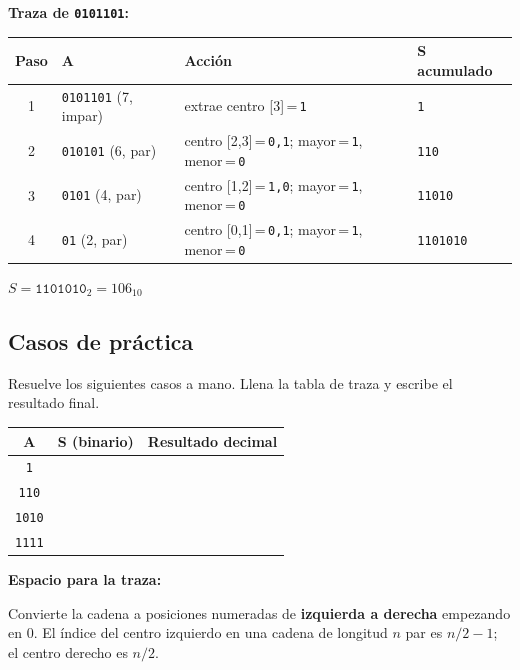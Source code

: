 \documentclass[12pt, oneside]{article}
\begin{document}
\textbf{Traza de \texttt{0101101}:}

\begin{center}
\begin{tabular}{clp{4cm}l}
  \toprule
  \textbf{Paso} & \textbf{A} & \textbf{Acción} & \textbf{S acumulado} \\
  \midrule
  1 & \texttt{0101101} (7, impar)  & extrae centro [3]\,=\,\texttt{1}          & \texttt{1} \\
  2 & \texttt{010101}  (6, par)    & centro [2,3]\,=\,\texttt{0,1}; mayor\,=\,\texttt{1}, menor\,=\,\texttt{0} & \texttt{110} \\
  3 & \texttt{0101}    (4, par)    & centro [1,2]\,=\,\texttt{1,0}; mayor\,=\,\texttt{1}, menor\,=\,\texttt{0} & \texttt{11010} \\
  4 & \texttt{01}      (2, par)    & centro [0,1]\,=\,\texttt{0,1}; mayor\,=\,\texttt{1}, menor\,=\,\texttt{0} & \texttt{1101010} \\
  \bottomrule
\end{tabular}
\end{center}

$S = \texttt{1101010}_2 = 106_{10}$ \checkmark

\subsection{Casos de práctica}

Resuelve los siguientes casos a mano.  Llena la tabla de traza y escribe el
resultado final.

\begin{center}
\begin{tabular}{ccc}
  \toprule
  \textbf{A} & \textbf{S (binario)} & \textbf{Resultado decimal} \\
  \midrule
  \texttt{1}    & & \\[8pt]
  \texttt{110}  & & \\[8pt]
  \texttt{1010} & & \\[8pt]
  \texttt{1111} & & \\[8pt]
  \bottomrule
\end{tabular}
\end{center}

\vspace{1cm}
\textbf{Espacio para la traza:}

\vspace{4cm}

\begin{consejo}
  Convierte la cadena a posiciones numeradas de \textbf{izquierda a derecha}
  empezando en 0.  El índice del centro izquierdo en una cadena de longitud $n$
  par es $n/2 - 1$; el centro derecho es $n/2$.
\end{consejo}
\end{document}
